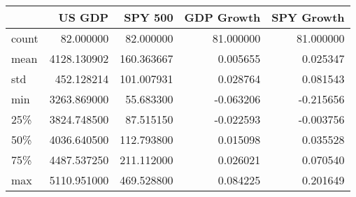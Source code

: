 
\begin{tabular}{lrrrr}
\toprule
 & US GDP & SPY 500 & GDP Growth & SPY Growth \\
 \midrule
count & 82.000000 & 82.000000 & 81.000000 & 81.000000 \\
mean & 4128.130902 & 160.363667 & 0.005655 & 0.025347 \\
std & 452.128214 & 101.007931 & 0.028764 & 0.081543 \\
min & 3263.869000 & 55.683300 & -0.063206 & -0.215656 \\
25\% & 3824.748500 & 87.515150 & -0.022593 & -0.003756 \\
50\% & 4036.640500 & 112.793800 & 0.015098 & 0.035528 \\
75\% & 4487.537250 & 211.112000 & 0.026021 & 0.070540 \\
max & 5110.951000 & 469.528800 & 0.084225 & 0.201649 \\
\bottomrule
\end{tabular}
